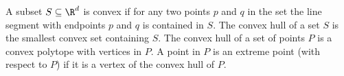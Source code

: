 A subset $S \subseteq \R^d$ is convex if for any two points $p$ and $q$
in the set the line segment with endpoints $p$ and $q$ is contained
in $S$. The convex hull of a set $S$ 
is the smallest convex set containing
$S$. The convex hull of a set of points $P$ is a convex 
polytope with vertices in $P$. A point in $P$ is an extreme point 
(with respect to $P$) if it is a vertex of 
the convex hull of $P$.
